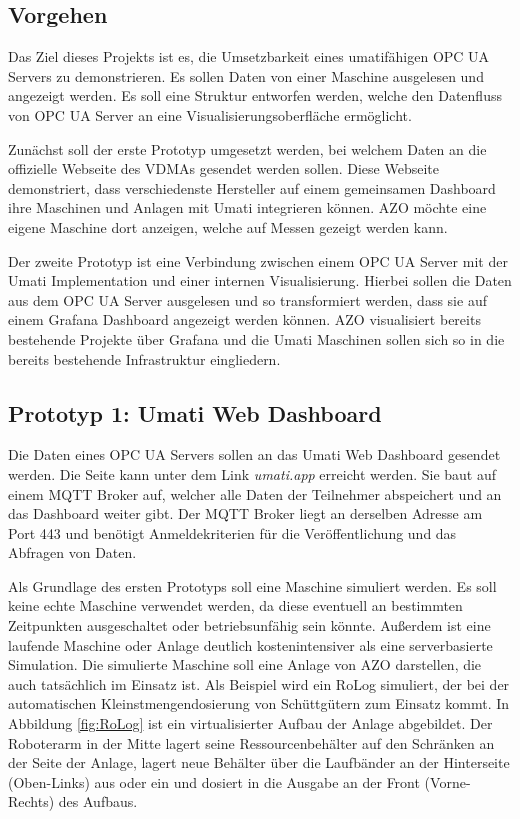 \documentclass[a4paper, 12pt, oneside, toc=listofnumbered, bibliography=totoc]{scrbook}
\begin{document}
		\subsection{Vorgehen}
		Das Ziel dieses Projekts ist es, die Umsetzbarkeit eines umatifähigen OPC UA Servers zu demonstrieren. Es sollen Daten von einer Maschine ausgelesen und angezeigt werden. Es soll eine Struktur entworfen werden, welche den Datenfluss von OPC UA Server an eine Visualisierungsoberfläche ermöglicht.
		
		Zunächst soll der erste Prototyp umgesetzt werden, bei welchem Daten an die offizielle Webseite des VDMAs gesendet werden sollen. Diese Webseite demonstriert, dass verschiedenste Hersteller auf einem gemeinsamen Dashboard ihre Maschinen und Anlagen mit Umati integrieren können. AZO möchte eine eigene Maschine dort anzeigen, welche auf Messen gezeigt werden kann.
		
		Der zweite Prototyp ist eine Verbindung zwischen einem OPC UA Server mit der Umati Implementation und einer internen Visualisierung. Hierbei sollen die Daten aus dem OPC UA Server ausgelesen und so transformiert werden, dass sie auf einem Grafana Dashboard angezeigt werden können. AZO visualisiert bereits bestehende Projekte über Grafana und die Umati Maschinen sollen sich so in die bereits bestehende Infrastruktur eingliedern.
		
		\subsection{Prototyp 1: Umati Web Dashboard}
		
		Die Daten eines OPC UA Servers sollen an das Umati Web Dashboard gesendet werden. Die Seite kann unter dem Link \textit{umati.app} erreicht werden. Sie baut auf einem MQTT Broker auf, welcher alle Daten der Teilnehmer abspeichert und an das Dashboard weiter gibt. Der MQTT Broker liegt an derselben Adresse am Port 443 und benötigt Anmeldekriterien für die Veröffentlichung und das Abfragen von Daten.
		
		Als Grundlage des ersten Prototyps soll eine Maschine simuliert werden. Es soll keine echte Maschine verwendet werden, da diese eventuell an bestimmten Zeitpunkten ausgeschaltet oder betriebsunfähig sein könnte. Außerdem ist eine laufende Maschine oder Anlage deutlich kostenintensiver als eine serverbasierte Simulation. Die simulierte Maschine soll eine Anlage von AZO darstellen, die auch tatsächlich im Einsatz ist. Als Beispiel wird ein RoLog simuliert, der bei der automatischen Kleinstmengendosierung von Schüttgütern zum Einsatz kommt. In Abbildung \ref{fig:RoLog} ist ein virtualisierter Aufbau der Anlage abgebildet. Der Roboterarm in der Mitte lagert seine Ressourcenbehälter auf den Schränken an der Seite der Anlage, lagert neue Behälter über die Laufbänder an der Hinterseite (Oben-Links) aus oder ein und dosiert in die Ausgabe an der Front (Vorne-Rechts) des Aufbaus. \cite{noauthor_azo_nodate}
		
\end{document}

